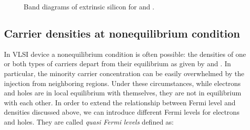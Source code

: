 \begin{figure}[!h]
\centering
{}
\caption{Band diagrams of extrinsic silicon for  and .}
\label{fig: Band diagrams of extrinsic silicon}
\end{figure}

\subsection{Carrier densities at nonequilibrium condition}

In VLSI device a nonequilibrium condition is often possible: the densities of one or both types of carriers depart from their equilibrium as given by  and .
In particular, the minority carrier concentration can be easily overwhelmed by the injection from neighboring regions. Under these circumstances, while electrons and holes are in local equilibrium with themselves, they are not in equilibrium with each other. In order to extend the relationship between Fermi level and densities discussed above, we can introduce different Fermi levels for electrons and holes. They are called \textit{quasi Fermi levels} defined as:

